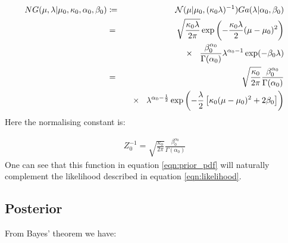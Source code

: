 \documentclass[12pt]{article} %
\begin{document}
	\begin{eqnarray}
	NG(\mu, \lambda | \mu_0, \kappa_0, \alpha_0, \beta_0) &\coloneqq& \mathcal{N}(\mu | \mu_0, (\kappa_0 \lambda)^{-1})Ga(\lambda | \alpha_0, \beta_0) \\
	&=&  \sqrt{\frac{\kappa_0 \lambda}{2\pi}} \exp \left(- \frac{\kappa_0 \lambda}{2}(\mu - \mu_0) ^ 2\right) \\
	& & \hspace{3mm} \times \hspace{3mm} \frac{\beta_0 ^{\alpha_0}}{\Gamma(\alpha_0)} \lambda ^{\alpha_0 - 1} \exp(-\beta_0 \lambda) \\
	&=& \sqrt{\frac{\kappa_0}{2\pi}} \frac{\beta_0 ^ {\alpha_0}}{\Gamma(\alpha_0)} \\
	& & \hspace{3mm} \times \hspace{3mm}  \lambda^{\alpha_0 - \frac{1}{2}} \exp\left(-\frac{\lambda}{2}\left[\kappa_0 (\mu - \mu_0)^2 + 2 \beta_0\right]\right) \label{eqn:prior_pdf}
	\end{eqnarray}
	Here the normalising constant is:
	
	\begin{eqnarray}
	Z_0^{-1} = \sqrt{\frac{\kappa_0}{2\pi}} \frac{\beta_0 ^ {\alpha_0}}{\Gamma(\alpha_0)}
	\end{eqnarray}
	One can see that this function in equation \ref{eqn:prior_pdf} will naturally complement the likelihood described in equation \ref{eqn:likelihood}.
	
	\subsection{Posterior}
	From Bayes' theorem we have:
	
\end{document}
